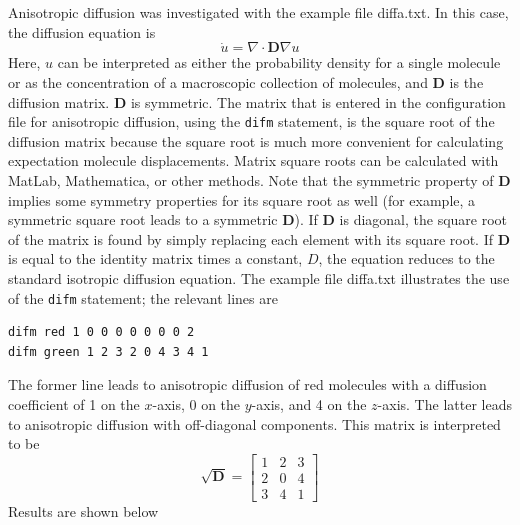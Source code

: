\documentclass {scrbook}
\newcommand {\ttt} {\texttt}
\begin{document}
Anisotropic diffusion was investigated with the example file diffa.txt. In this case, the diffusion equation is
$$\dot{u} = \nabla \cdot \mathbf{D} \nabla u$$
Here, $u$ can be interpreted as either the probability density for a single molecule or as the concentration of a macroscopic collection of molecules, and $\mathbf{D}$ is the diffusion matrix. $\mathbf{D}$ is symmetric. The matrix that is entered in the configuration file for anisotropic diffusion, using the \ttt{difm} statement, is the square root of the diffusion matrix because the square root is much more convenient for calculating expectation molecule displacements. Matrix square roots can be calculated with MatLab, Mathematica, or other methods. Note that the symmetric property of $\mathbf{D}$ implies some symmetry properties for its square root as well (for example, a symmetric square root leads to a symmetric $\mathbf{D}$). If $\mathbf{D}$ is diagonal, the square root of the matrix is found by simply replacing each element with its square root. If $\mathbf{D}$ is equal to the identity matrix times a constant, $D$, the equation reduces to the standard isotropic diffusion equation. The example file diffa.txt illustrates the use of the \ttt{difm} statement; the relevant lines are
\begin{lstlisting}[style=SSAC]
difm red 1 0 0 0 0 0 0 0 2
difm green 1 2 3 2 0 4 3 4 1
\end{lstlisting}
The former line leads to anisotropic diffusion of red molecules with a diffusion coefficient of 1 on the $x$-axis, 0 on the $y$-axis, and 4 on the $z$-axis. The latter leads to anisotropic diffusion with off-diagonal components. This matrix is interpreted to be
$$\sqrt{\mathbf{D}} = \left[ \begin{array}{ccc} 1 & 2 & 3\\ 2 & 0 & 4\\ 3 & 4 & 1 \end{array} \right]$$
Results are shown below
\end{document}
